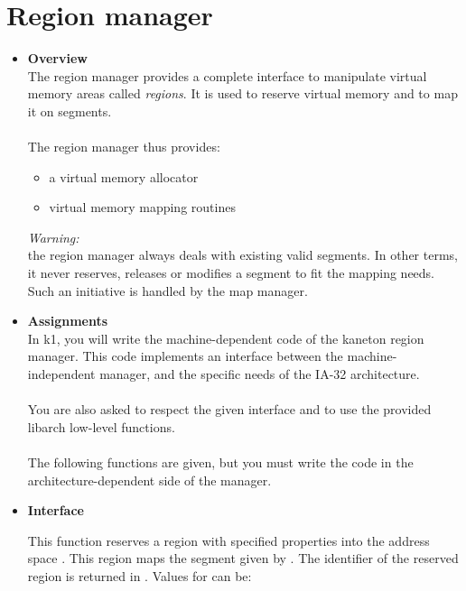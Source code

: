 \section{Region manager}
\begin{itemize}
  \item {\bf Overview}\\
    The region manager provides a complete interface to manipulate virtual memory
    areas called {\em regions}. It is used to reserve virtual memory and to map it
    on segments.\\
    \\
    The region manager thus provides:

    \begin{itemize}
      \item a virtual memory allocator
      \item virtual memory mapping routines\\
    \end{itemize}

    {\em Warning:}\\
    the region manager always deals with existing valid segments. In
    other terms, it never reserves, releases or modifies a segment to fit the mapping
    needs. Such an initiative is handled by the map manager.\\

  \item {\bf Assignments}\\
    In k1, you will write the machine-dependent code of the kaneton region manager.
    This code implements an interface between the machine-independent manager, and
    the specific needs of the IA-32 architecture.\\
    \\
    You are also asked to respect the given interface and to use the provided
    libarch low-level functions.\\
    \\
    The following functions are given, but you must write the code in
    the architecture-dependent side of the manager.

  \item {\bf Interface}\\
	 {
	   This function reserves a region with specified properties
	   into the address space . This region maps the
	   segment given by . The identifier of the reserved region is returned in . Values for  can be:

}
\end{itemize}
